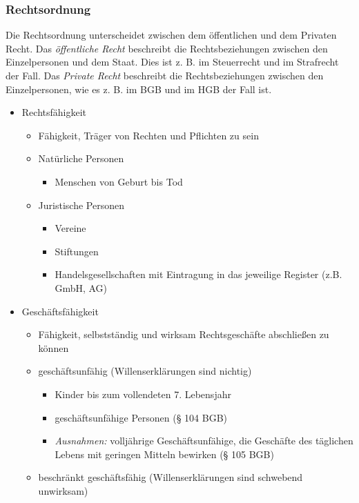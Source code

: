 \subsubsection{Rechtsordnung}
Die Rechtsordnung unterscheidet zwischen dem öffentlichen und dem Privaten Recht. Das {\it öffentliche Recht} beschreibt die Rechtsbeziehungen zwischen den Einzelpersonen und dem Staat. Dies ist z. B. im Steuerrecht und im Strafrecht der Fall. Das {\it Private Recht} beschreibt die Rechtsbeziehungen zwischen den Einzelpersonen, wie es z. B. im BGB und im HGB der Fall ist.

\begin{itemize}
	\item Rechtsfähigkeit
		\begin{itemize}
			\item Fähigkeit, Träger von Rechten und Pflichten zu sein
			\item Natürliche Personen
				\begin{itemize}
					\item Menschen von Geburt bis Tod
				\end{itemize}
			\item Juristische Personen
				\begin{itemize}
					\item Vereine
					\item Stiftungen
					\item Handelsgesellschaften mit Eintragung in das jeweilige Register (z.B. GmbH, AG)
				\end{itemize}
		\end{itemize}
	\item Geschäftsfähigkeit
		\begin{itemize}
			\item Fähigkeit, selbstständig und wirksam Rechtsgeschäfte abschließen zu können
			\item geschäftsunfähig (Willenserklärungen sind nichtig)
				\begin{itemize}
					\item Kinder bis zum vollendeten 7. Lebensjahr
					\item geschäftsunfähige Personen (§ 104 BGB)
					\item {\it Ausnahmen:} volljährige Geschäftsunfähige, die Geschäfte des täglichen Lebens mit geringen Mitteln bewirken (§ 105 BGB)
				\end{itemize}
			\item beschränkt geschäftsfähig (Willenserklärungen sind schwebend unwirksam)

\end{itemize}
\end{itemize}
